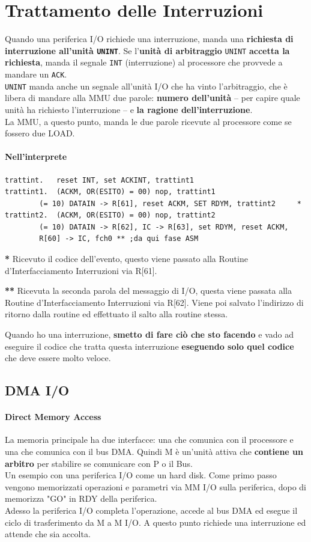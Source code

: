 \documentclass[10pt]{report}
\begin{document}
\section{Trattamento delle Interruzioni}
Quando una periferica I/O richiede una interruzione, manda una \textbf{richiesta di interruzione all'unità \texttt{UNINT}}. Se l'\textbf{unità di arbitraggio} \texttt{UNINT} \textbf{accetta la richiesta}, manda il segnale \texttt{INT} (interruzione) al processore che provvede a mandare un \texttt{ACK}.\\
\texttt{UNINT} manda anche un segnale all'unità I/O che ha vinto l'arbitraggio, che è libera di mandare alla MMU due parole: \textbf{numero dell'unità} -- per capire quale unità ha richiesto l'interruzione -- e \textbf{la ragione dell'interruzione}.\\
La MMU, a questo punto, manda le due parole ricevute al processore come se fossero due LOAD.
\paragraph{Nell'interprete}
\begin{lstlisting}
trattint.	reset INT, set ACKINT, trattint1
trattint1.	(ACKM, OR(ESITO) = 00) nop, trattint1
		(= 10) DATAIN -> R[61], reset ACKM, SET RDYM, trattint2		*
trattint2.	(ACKM, OR(ESITO) = 00) nop, trattint2
		(= 10) DATAIN -> R[62], IC -> R[63], set RDYM, reset ACKM,
		R[60] -> IC, fch0 ** ;da qui fase ASM
\end{lstlisting}
\begin{list}{}{}
	\item \textbf{*} Ricevuto il codice dell'evento, questo viene passato alla Routine d'Interfacciamento Interruzioni via R[61].
	\item \textbf{**} Ricevuta la seconda parola del messaggio di I/O, questa viene passata alla Routine d'Interfacciamento Interruzioni via R[62]. Viene poi salvato l'indirizzo di ritorno dalla routine ed effettuato il salto alla routine stessa.
\end{list}
Quando ho una interruzione, \textbf{smetto di fare ciò che sto facendo} e vado ad eseguire il codice che tratta questa interruzione \textbf{eseguendo solo quel codice} che deve essere molto veloce.
\subsection{DMA I/O}
\paragraph{Direct Memory Access} La memoria principale ha due interfacce: una che comunica con il processore e una che comunica con il bus DMA. Quindi M è un'unità attiva che \textbf{contiene un arbitro} per stabilire se comunicare con P o il Bus.\\
Un esempio con una periferica I/O come un hard disk. Come primo passo vengono memorizzati operazioni e parametri via MM I/O sulla periferica, dopo di memorizza "GO" in RDY della periferica.\\
Adesso la periferica I/O completa l'operazione, accede al bus DMA ed esegue il ciclo di trasferimento da M a M I/O. A questo punto richiede una interruzione ed attende che sia accolta.
\pagebreak
\end{document}
